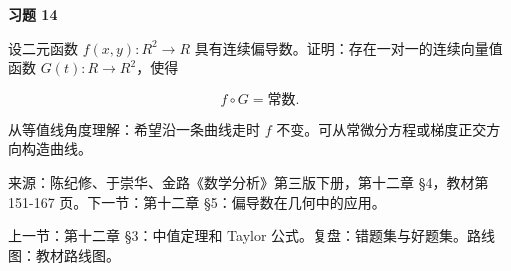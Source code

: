 \begin{exercisebox}
\textbf{习题 14}

设二元函数 \(f(x,y):R^2\to R\) 具有连续偏导数。证明：存在一对一的连续向量值函数 \(G(t):R\to R^2\)，使得

\[
        f\circ G=\text{常数}.
      \]

\begin{hintbox}
从等值线角度理解：希望沿一条曲线走时 \(f\) 不变。可从常微分方程或梯度正交方向构造曲线。
\end{hintbox}
\end{exercisebox}

来源：陈纪修、于崇华、金路《数学分析》第三版下册，第十二章 §4，教材第 151-167 页。下一节：第十二章 §5：偏导数在几何中的应用。

上一节：第十二章 §3：中值定理和 Taylor 公式。复盘：错题集与好题集。路线图：教材路线图。
